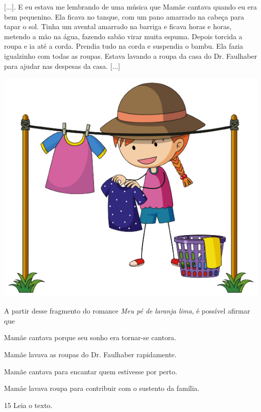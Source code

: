 \begin{myquote}
{[}...{]}. E eu estava me lembrando de uma música que Mamãe cantava
quando eu era bem pequenino. Ela ficava no tanque, com um pano amarrado
na cabeça para tapar o sol. Tinha um avental amarrado na barriga e
ficava horas e horas, metendo a mão na água, fazendo sabão virar muita
espuma. Depois torcida a roupa e ia até a corda. Prendia tudo na corda e
suspendia o bambu. Ela fazia igualzinho com todas as roupas. Estava
lavando a roupa da casa do Dr. Faulhaber para ajudar nas despesas da
casa. {[}...{]}

\begin{center}
\includegraphics[width=.4\textwidth]{./media/image23o.png}
\end{center}

\end{myquote}

A partir desse fragmento do romance \emph{Meu pé de laranja lima}, é
possível afirmar que

\begin{escolha}
\item Mamãe cantava porque seu sonho era tornar-se cantora.

\item Mamãe lavava as roupas do Dr. Faulhaber rapidamente.

\item Mamãe cantava para encantar quem estivesse por perto.

\item Mamãe lavava roupa para contribuir com o sustento da família.
\end{escolha}


\num{15} Leia o texto.

